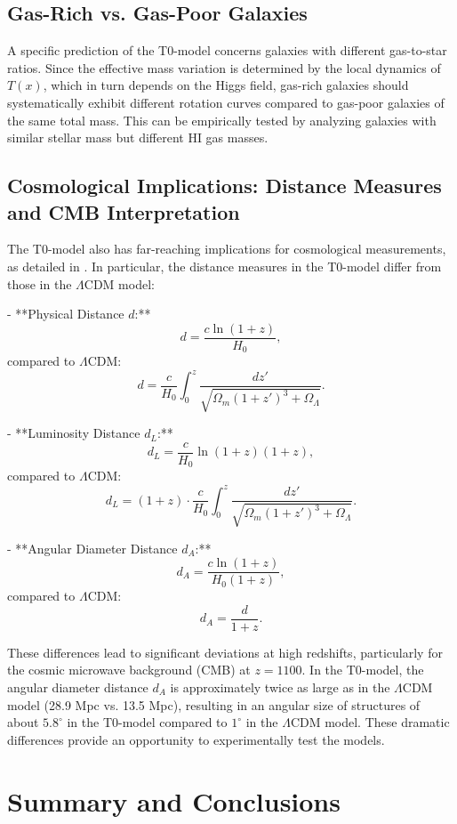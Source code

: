 \documentclass[a4paper,12pt]{article}
\newcommand{\Tfield}{T(x)}
\begin{document}
	\subsection{Gas-Rich vs. Gas-Poor Galaxies}
	
	A specific prediction of the T0-model concerns galaxies with different gas-to-star ratios. Since the effective mass variation is determined by the local dynamics of \( \Tfield \), which in turn depends on the Higgs field, gas-rich galaxies should systematically exhibit different rotation curves compared to gas-poor galaxies of the same total mass. This can be empirically tested by analyzing galaxies with similar stellar mass but different HI gas masses.
	
	\subsection{Cosmological Implications: Distance Measures and CMB Interpretation}
	
	The T0-model also has far-reaching implications for cosmological measurements, as detailed in \cite{pascher_messdifferenzen_2025}. In particular, the distance measures in the T0-model differ from those in the \( \Lambda \)CDM model:
	
	- **Physical Distance \( d \):**
	\[
	d = \frac{c \ln(1 + z)}{H_0},
	\]
	compared to \( \Lambda \)CDM:
	\[
	d = \frac{c}{H_0} \int_0^z \frac{dz'}{\sqrt{\Omega_m (1 + z')^3 + \Omega_\Lambda}}.
	\]
	
	- **Luminosity Distance \( d_L \):**
	\[
	d_L = \frac{c}{H_0} \ln(1 + z) (1 + z),
	\]
	compared to \( \Lambda \)CDM:
	\[
	d_L = (1 + z) \cdot \frac{c}{H_0} \int_0^z \frac{dz'}{\sqrt{\Omega_m (1 + z')^3 + \Omega_\Lambda}}.
	\]
	
	- **Angular Diameter Distance \( d_A \):**
	\[
	d_A = \frac{c \ln(1 + z)}{H_0 (1 + z)},
	\]
	compared to \( \Lambda \)CDM:
	\[
	d_A = \frac{d}{1 + z}.
	\]
	
	These differences lead to significant deviations at high redshifts, particularly for the cosmic microwave background (CMB) at \( z = 1100 \). In the T0-model, the angular diameter distance \( d_A \) is approximately twice as large as in the \( \Lambda \)CDM model (28.9 Mpc vs. 13.5 Mpc), resulting in an angular size of structures of about \( 5.8^\circ \) in the T0-model compared to \( 1^\circ \) in the \( \Lambda \)CDM model. These dramatic differences provide an opportunity to experimentally test the models.
	
	\section{Summary and Conclusions}
	
\end{document}
